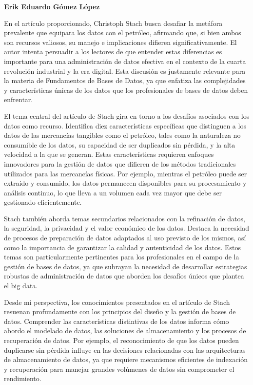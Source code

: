 \begin{center}
    \textbf{Erik Eduardo Gómez López} 
\end{center}

En el artículo proporcionado, Christoph Stach busca desafiar la metáfora prevalente que equipara los datos con el petróleo, afirmando que, si bien ambos son recursos valiosos, su manejo e implicaciones difieren significativamente. El autor intenta persuadir a los lectores de que entender estas diferencias es importante para una administración de datos efectiva en el contexto de la cuarta revolución industrial y la era digital. Esta discusión es justamente relevante para la materia de Fundamentos de Bases de Datos, ya que enfatiza las complejidades y características únicas de los datos que los profesionales de bases de datos deben enfrentar.

El tema central del artículo de Stach gira en torno a los desafíos  asociados con los datos como recurso. Identifica diez características específicas que distinguen a los datos de las mercancías tangibles como el petróleo, tales como la naturaleza no consumible de los datos, su capacidad de ser duplicados sin pérdida, y la alta velocidad a la que se generan. Estas características requieren enfoques innovadores para la gestión de datos que difieren de los métodos tradicionales utilizados para las mercancías físicas. Por ejemplo, mientras el petróleo puede ser extraído y consumido, los datos permanecen disponibles para su procesamiento y análisis continuo, lo que lleva a un volumen cada vez mayor que debe ser gestionado eficientemente.

Stach también aborda temas secundarios relacionados con la refinación de datos, la seguridad, la privacidad y el valor económico de los datos. Destaca la necesidad de procesos de preparación de datos adaptados al uso previsto de los mismos, así como la importancia de garantizar la calidad y autenticidad de los datos. Estos temas son particularmente pertinentes para los profesionales en el campo de la gestión de bases de datos, ya que subrayan la necesidad de desarrollar estrategias robustas de administración de datos que aborden los desafíos únicos que plantea el big data.

Desde mi perspectiva, los conocimientos presentados en el artículo de Stach resuenan profundamente con los principios del diseño y la gestión de bases de datos. Comprender las características distintivas de los datos informa cómo abordo el modelado de datos, las soluciones de almacenamiento y los procesos de recuperación de datos. Por ejemplo, el reconocimiento de que los datos pueden duplicarse sin pérdida influye en las decisiones relacionadas con las arquitecturas de almacenamiento de datos, ya que requiere mecanismos eficientes de indexación y recuperación para manejar grandes volúmenes de datos sin comprometer el rendimiento.

